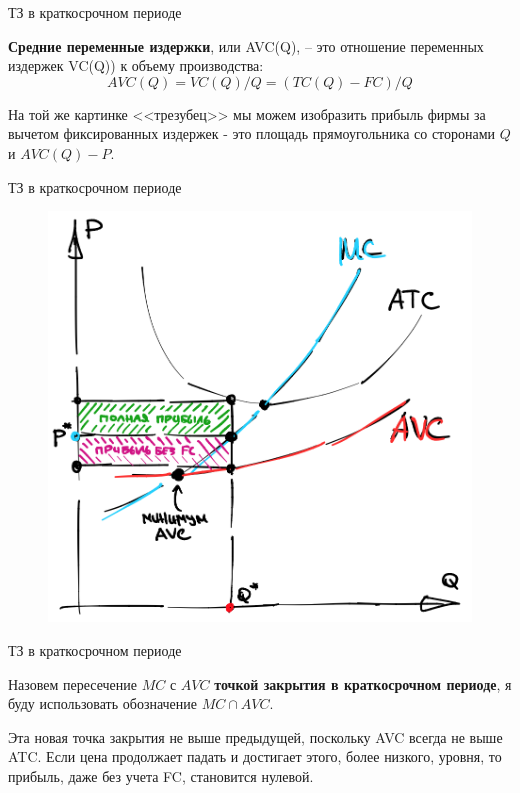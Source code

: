 \documentclass{beamer}
\begin{document}
\begin{frame}{ТЗ в краткосрочном периоде}

\begin{definition}
\textbf{Средние переменные издержки}, или AVC(Q), – это отношение переменных издержек VC(Q)) к объему производства:
$$AVC(Q) = VC(Q)/Q = (TC(Q) - FC)/Q$$
\end{definition}

На той же картинке <<трезубец>> мы можем изобразить прибыль фирмы за вычетом фиксированных издержек - это площадь прямоугольника со сторонами $Q$ и $AVC(Q)-P$. 

\end{frame}

\begin{frame}{ТЗ в краткосрочном периоде}

\begin{figure}[hbt]
\centering
\includegraphics[width=.7 \textwidth]{trident2.png}
\end{figure}

\end{frame}


\begin{frame}{ТЗ в краткосрочном периоде}

\begin{definition}
Назовем пересечение $MC$ с $AVC$ \textbf{точкой закрытия в краткосрочном периоде}, я буду использовать обозначение $MC \cap AVC$.
\end{definition}

Эта новая точка закрытия не выше предыдущей, поскольку AVC всегда не выше ATC. Если цена продолжает падать и достигает этого, более низкого, уровня, то прибыль, даже без учета FC, становится нулевой.

\end{frame}
\end{document}
